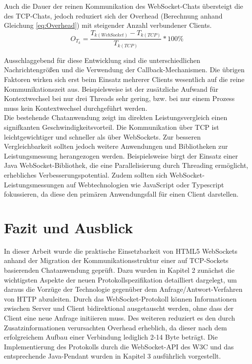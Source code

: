 \documentclass[11pt,a4paper,titlepage]{scrartcl}
\numberwithin{equation}{section}
\begin{document}
\noindent Auch die Dauer der reinen Kommunikation des WebSocket-Chats übersteigt die des TCP-Chats, jedoch reduziert sich der Overhead (Berechnung anhand Gleichung \ref{eq:Overhead}) mit steigender Anzahl verbundener Clients. \\
\begin{equation}\label{eq:Overhead}
	O_{T_{k}} = \dfrac{T_{k (WebSocket)} - T_{k(TCP)}}{T_{k(TCP)}} \ast 100\%
\end{equation}

\noindent Ausschlaggebend für diese Entwicklung sind die unterschiedlichen Nachrichtengrößen und die Verwendung der Callback-Mechanismen. Die übrigen Faktoren wirken sich erst beim Einsatz mehrerer Clients wesentlich auf die reine Kommunikationszeit aus. Beispielsweise ist der zusätzliche Aufwand für Kontextwechsel bei nur drei Threads sehr gering, bzw. bei nur einem Prozess muss kein Kontextwechsel durchgeführt werden. \\

\noindent Die bestehende Chatanwendung zeigt im direkten Leistungsvergleich einen signifkanten Geschwindigkeitsvorteil. Die Kommunikation über TCP ist leichtgewichtiger und schneller als über WebSockets. Zur besseren Vergleichbarkeit sollten jedoch weitere Anwendungen und Bibliotheken zur Leistungsmessung herangezogen werden. Beispielsweise birgt der Einsatz einer Java WebSocket-Bibliothek, die eine Parallelisierung durch Threading ermöglicht, erhebliches Verbesserungspotential. Zudem sollten sich WebSocket-Leistungsmessungen auf Webtechnologien wie JavaScript oder Typescript fokussieren, da diese den primären Anwendungsfall für einen Client darstellen. 

\newpage
\section{Fazit und Ausblick}
In dieser Arbeit wurde die praktische Einsetzbarkeit von HTML5 WebSockets anhand der Migration der Kommunikationsstruktur einer auf TCP-Sockets basierenden Chatanwendung geprüft. Dazu wurden in Kapitel 2 zunächst die wichtigsten Aspekte der neuen Protokollspezifikation detailliert dargelegt, um daraus die Vorzüge der Technologie gegenüber dem Anfrage/Antwort-Verfahren von HTTP abzuleiten. Durch das WebSocket-Protokoll können Informationen zwischen Server und Client bidirektional ausgetauscht werden, ohne dass der Client eine neue Anfrage initiieren muss. Des weiteren reduziert es den durch Zusatzinformationen verursachten Overhead erheblich, da dieser nach dem erfolgreichem Aufbau einer Verbindung lediglich 2-14 Byte beträgt. Die Implementierung des Protokolls durch die WebSocket-API des W3C und das entsprechende Java-Pendant wurden in Kapitel 3 ausführlich vorgestellt.\\
\end{document}
